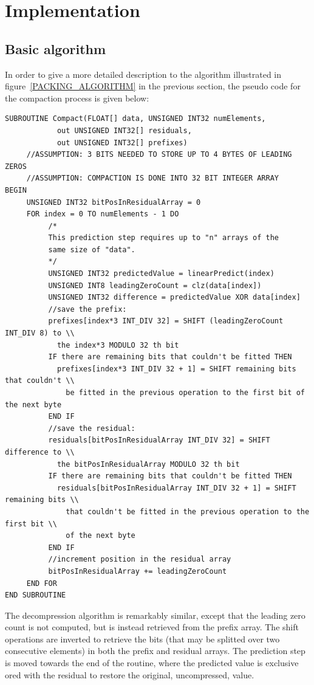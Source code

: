 \section{Implementation}
 \subsection{Basic algorithm}
  In order to give a more detailed description to the algorithm illustrated in figure~\ref{PACKING_ALGORITHM} in the previous section, the pseudo code for the compaction
  process is given below:
\begin{verbatim}
SUBROUTINE Compact(FLOAT[] data, UNSIGNED INT32 numElements, 
		    out UNSIGNED INT32[] residuals, 
		    out UNSIGNED INT32[] prefixes)
	 //ASSUMPTION: 3 BITS NEEDED TO STORE UP TO 4 BYTES OF LEADING ZEROS
	 //ASSUMPTION: COMPACTION IS DONE INTO 32 BIT INTEGER ARRAY
BEGIN
	 UNSIGNED INT32 bitPosInResidualArray = 0
	 FOR index = 0 TO numElements - 1 DO
		  /*
		  This prediction step requires up to "n" arrays of the 
		  same size of "data".
		  */
		  UNSIGNED INT32 predictedValue = linearPredict(index) 
		  UNSIGNED INT8 leadingZeroCount = clz(data[index])
		  UNSIGNED INT32 difference = predictedValue XOR data[index]
		  //save the prefix:
		  prefixes[index*3 INT_DIV 32] = SHIFT (leadingZeroCount INT_DIV 8) to \\
		    the index*3 MODULO 32 th bit
		  IF there are remaining bits that couldn't be fitted THEN
		    prefixes[index*3 INT_DIV 32 + 1] = SHIFT remaining bits that couldn't \\
		      be fitted in the previous operation to the first bit of the next byte
		  END IF
		  //save the residual:
		  residuals[bitPosInResidualArray INT_DIV 32] = SHIFT difference to \\
		    the bitPosInResidualArray MODULO 32 th bit
		  IF there are remaining bits that couldn't be fitted THEN
		    residuals[bitPosInResidualArray INT_DIV 32 + 1] = SHIFT remaining bits \\
		      that couldn't be fitted in the previous operation to the first bit \\
		      of the next byte
		  END IF  
		  //increment position in the residual array
		  bitPosInResidualArray += leadingZeroCount
	 END FOR
END SUBROUTINE 
\end{verbatim}
The decompression algorithm is remarkably similar, except that the leading zero count is not computed, but is instead retrieved from the prefix array. The shift
operations are inverted to retrieve the bits (that may be splitted over two consecutive elements) in both the prefix and residual arrays. The prediction step is moved towards
the end of the routine, where the predicted value is exclusive ored with the residual to restore the original, uncompressed, value.
